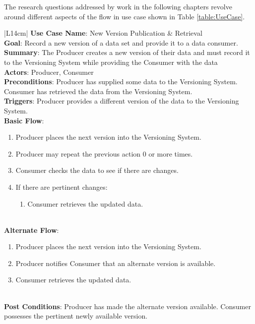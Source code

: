 The research questions addressed by work in the following chapters revolve around different aspects of the flow in use case shown in Table \ref{table:UseCase}.
\begin{table}
	\caption{Versioning Use Case Table}
	\label{table:UseCase}
	\centering
	\begin{tabular}{|L{14cm}|}
		\hline
		\textbf{Use Case Name}: New Version Publication \& Retrieval\\
		\hline
		\textbf{Goal}: Record a new version of a data set and provide it to a data consumer.\\
		\hline
		\textbf{Summary}: The Producer creates a new version of their data and must record it to the Versioning System while providing the Consumer with the data\\
		\hline
		\textbf{Actors}: Producer, Consumer\\
		\hline
		\textbf{Preconditions}: Producer has supplied some data to the Versioning System.   Consumer has retrieved the data from the Versioning System.\\
		\hline
		\textbf{Triggers}: Producer provides a different version of the data to the Versioning System.\\
		\hline
		\textbf{Basic Flow}: 
		\begin{enumerate}
			\item Producer places the next version into the Versioning System.
			\item Producer may repeat the previous action 0 or more times.
			\item Consumer checks the data to see if there are changes.
			\item If there are pertinent changes:
			\begin{enumerate}
				\item Consumer retrieves the updated data.
			\end{enumerate}
		\end{enumerate}\\
		\hline
		\textbf{Alternate Flow}:
		\begin{enumerate}
			\item Producer places the next version into the Versioning System.
			\item Producer notifies Consumer that an alternate version is available.
			\item Consumer retrieves the updated data.
		\end{enumerate}\\
		\hline
		\textbf{Post Conditions}: Producer has made the alternate version available.  Consumer possesses the pertinent newly available version.\\
		\hline
	\end{tabular}
\end{table}
